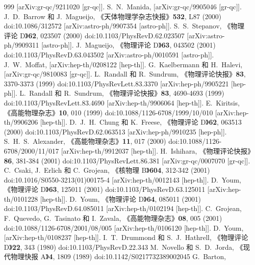 \documentclass[jkps,preprint,fleqn]{revtex4}
\begin{document}
\begin{thebibliography}{999}
[arXiv:gr-qc/9211020 [gr-qc]].
S.~N.~Manida,
[arXiv:gr-qc/9905046 [gr-qc]].
J.~D.~Barrow 和 J.~Magueijo,
《天体物理学杂志快报》\textbf{532}, L87 (2000)
doi:10.1086/312572
[arXiv:astro-ph/9907354 [astro-ph]].
S.~S.~Stepanov,
《物理评论 D》\textbf{62}, 023507 (2000)
doi:10.1103/PhysRevD.62.023507
[arXiv:astro-ph/9909311 [astro-ph]].
J.~Magueijo,
《物理评论 D》\textbf{63}, 043502 (2001)
doi:10.1103/PhysRevD.63.043502
[arXiv:astro-ph/0010591 [astro-ph]].
J.~W.~Moffat,
[arXiv:hep-th/0208122 [hep-th]].
G.~Kaelbermann 和 H.~Halevi,
[arXiv:gr-qc/9810083 [gr-qc]].
L.~Randall 和 R.~Sundrum,
《物理评论快报》\textbf{83}, 3370-3373 (1999)
doi:10.1103/PhysRevLett.83.3370
[arXiv:hep-ph/9905221 [hep-ph]].
L.~Randall 和 R.~Sundrum,
《物理评论快报》\textbf{83}, 4690-4693 (1999)
doi:10.1103/PhysRevLett.83.4690
[arXiv:hep-th/9906064 [hep-th]].
E.~Kiritsis,
《高能物理杂志》\textbf{10}, 010 (1999)
doi:10.1088/1126-6708/1999/10/010
[arXiv:hep-th/9906206 [hep-th]].
D.~J.~H.~Chung 和 K.~Freese,
《物理评论 D》\textbf{62}, 063513 (2000)
doi:10.1103/PhysRevD.62.063513
[arXiv:hep-ph/9910235 [hep-ph]].
S.~H.~S.~Alexander,
《高能物理杂志》\textbf{11}, 017 (2000)
doi:10.1088/1126-6708/2000/11/017
[arXiv:hep-th/9912037 [hep-th]].
H.~Ishihara,
《物理评论快报》\textbf{86}, 381-384 (2001)
doi:10.1103/PhysRevLett.86.381
[arXiv:gr-qc/0007070 [gr-qc]].
C.~Csaki, J.~Erlich 和 C.~Grojean,
《核物理 B》\textbf{604}, 312-342 (2001)
doi:10.1016/S0550-3213(01)00175-4
[arXiv:hep-th/0012143 [hep-th]].
D.~Youm,
《物理评论 D》\textbf{63}, 125011 (2001)
doi:10.1103/PhysRevD.63.125011
[arXiv:hep-th/0101228 [hep-th]].
D.~Youm,
《物理评论 D》\textbf{64}, 085011 (2001)
doi:10.1103/PhysRevD.64.085011
[arXiv:hep-th/0102194 [hep-th]].
C.~Grojean, F.~Quevedo, G.~Tasinato 和 I.~Zavala,
《高能物理杂志》\textbf{08}, 005 (2001)
doi:10.1088/1126-6708/2001/08/005
[arXiv:hep-th/0106120 [hep-th]].
D.~Youm,
[arXiv:hep-th/0108237 [hep-th]].
I.~T.~Drummond 和 S.~J.~Hathrell,
《物理评论 D》\textbf{22}, 343 (1980)
doi:10.1103/PhysRevD.22.343
M.~Novello 和 S.~D.~Jorda,
《现代物理快报 A》\textbf{4}, 1809 (1989)
doi:10.1142/S0217732389002045
G.~Barton,

\end{thebibliography}
\end{document}
